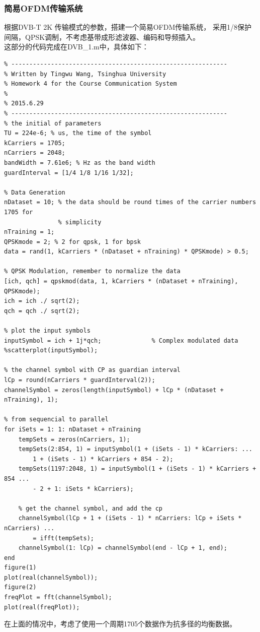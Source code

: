 \documentclass{article}
\begin{document}
\subsubsection{简易OFDM传输系统}
根据DVB-T 2K 传输模式的参数，搭建一个简易OFDM传输系统，
采用1/8保护间隔，QPSK调制，不考虑基带成形滤波器、编码和导频插入。\\
这部分的代码完成在DVB\_1.m中，具体如下：
\begin{lstlisting}
% ------------------------------------------------------------
% Written by Tingwu Wang, Tsinghua University
% Homework 4 for the Course Communication System
%
% 2015.6.29
% ------------------------------------------------------------
% the initial of parameters
TU = 224e-6; % us, the time of the symbol
kCarriers = 1705;
nCarriers = 2048;
bandWidth = 7.61e6; % Hz as the band width
guardInterval = [1/4 1/8 1/16 1/32];

% Data Generation
nDataset = 10; % the data should be round times of the carrier numbers 1705 for 
               % simplicity
nTraining = 1;
QPSKmode = 2; % 2 for qpsk, 1 for bpsk
data = rand(1, kCarriers * (nDataset + nTraining) * QPSKmode) > 0.5;
                                           
% QPSK Modulation, remember to normalize the data
[ich, qch] = qpskmod(data, 1, kCarriers * (nDataset + nTraining), QPSKmode);
ich = ich ./ sqrt(2);
qch = qch ./ sqrt(2);

% plot the input symbols
inputSymbol = ich + 1j*qch;              % Complex modulated data
%scatterplot(inputSymbol);

% the channel symbol with CP as guardian interval
lCp = round(nCarriers * guardInterval(2));
channelSymbol = zeros(length(inputSymbol) + lCp * (nDataset + nTraining), 1);

% from sequencial to parallel
for iSets = 1: 1: nDataset + nTraining
    tempSets = zeros(nCarriers, 1);
    tempSets(2:854, 1) = inputSymbol(1 + (iSets - 1) * kCarriers: ...
        1 + (iSets - 1) * kCarriers + 854 - 2);
    tempSets(1197:2048, 1) = inputSymbol(1 + (iSets - 1) * kCarriers + 854 ...
        - 2 + 1: iSets * kCarriers);

    % get the channel symbol, and add the cp
    channelSymbol(lCp + 1 + (iSets - 1) * nCarriers: lCp + iSets * nCarriers) ...
        = ifft(tempSets);
    channelSymbol(1: lCp) = channelSymbol(end - lCp + 1, end);
end
figure(1)
plot(real(channelSymbol));
figure(2)
freqPlot = fft(channelSymbol);
plot(real(freqPlot));
\end{lstlisting}
在上面的情况中，考虑了使用一个周期1705个数据作为抗多径的均衡数据。
\end{document}
